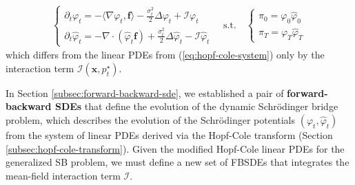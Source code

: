 \documentclass{article}
\begin{document}
\begin{definition}
    \begin{align}
        \begin{cases}
            \partial_t \varphi_t=-\langle\nabla \varphi_t, \boldsymbol{f}\rangle-\frac{\sigma_t^2}{2}\Delta \varphi_t+\mathcal{I}\varphi_t\\
            \partial_t \hat{\varphi}_t=-\nabla \cdot (\hat{\varphi}_t \boldsymbol{f})+\frac{\sigma_t^2}{2}\Delta \hat{\varphi}_t-\mathcal{I}\hat\varphi_t
        \end{cases}\quad \text{s.t.}\quad
        \begin{cases}
            \pi_0=\varphi_0\hat\varphi_0\\
            \pi_T=\varphi_T\hat\varphi_T
        \end{cases}\label{eq:gsbm-hopf-cole}
    \end{align}
    which differs from the linear PDEs from (\ref{eq:hopf-cole-system}) only by the interaction term $\mathcal{I}(\boldsymbol{x},p_t^\star)$.
\end{definition}

In Section \ref{subsec:forward-backward-sde}, we established a pair of \textbf{forward-backward SDEs} that define the evolution of the dynamic Schrödinger bridge problem, which describes the evolution of the Schrödinger potentials $(\varphi_t, \hat\varphi_t)$ from the system of linear PDEs derived via the Hopf-Cole transform (Section \ref{subsec:hopf-cole-transform}). Given the modified Hopf-Cole linear PDEs for the generalized SB problem, we must define a new set of FBSDEs that integrates the mean-field interaction term $\mathcal{I}$.
\end{document}
